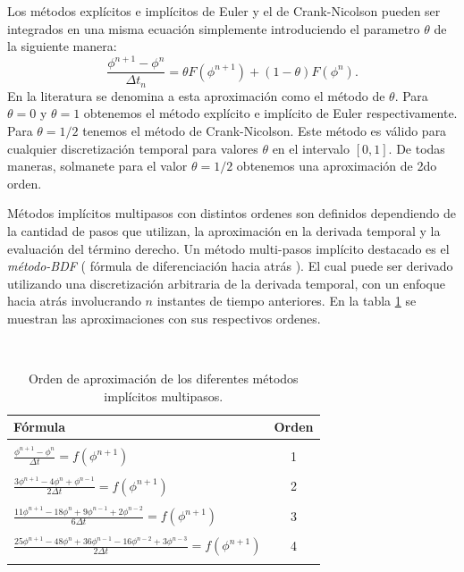 \documentclass[a4paper,10pt, oneside]{book}
\begin{document}
Los métodos explícitos e implícitos de Euler y el de Crank-Nicolson pueden ser integrados en una misma ecuación simplemente introduciendo el parametro $\theta$ de la siguiente manera:
\begin{equation}
	\frac{\phi^{n+1} - \phi^n}{\Delta t_n} = \theta F(\phi^{n+1}) + (1-\theta) F(\phi^n). \nonumber
\end{equation}
En la literatura se denomina a esta aproximación como el método de $\theta$. Para $\theta = 0$ y $\theta = 1$ obtenemos el método explícito e implícito de Euler respectivamente. Para $\theta = 1/2$ tenemos el método de Crank-Nicolson. Este método es válido para cualquier discretización temporal para valores $\theta$ en el intervalo $[0,1]$. De todas maneras, solmanete para el valor $\theta = 1/2$ obtenemos una aproximación de 2do orden.

Métodos implícitos multipasos con distintos ordenes son definidos dependiendo de la cantidad de pasos que utilizan, la aproximación en la derivada temporal y la evaluación del término derecho. Un método multi-pasos implícito destacado es el \textit{método-BDF} ( fórmula de diferenciación hacia atrás ). El cual puede ser derivado utilizando una discretización arbitraria de la derivada temporal, con un enfoque hacia atrás involucrando $n$ instantes de tiempo anteriores. En la tabla \ref{table52} se muestran las aproximaciones con sus respectivos ordenes.

$~$

\begin{table}[h!]
\centering
\begin{tabular}{| l c |}
\hline
Fórmula & Orden \\
\hline
 & \\
$\frac{\phi^{n+1} - \phi^n}{\Delta t} = f(\phi^{n+1}) $ & 1 \\
 & \\
$\frac{3 \phi^{n+1} - 4 \phi^n + \phi^{n-1}}{2 \Delta t} = f(\phi^{n+1}) $ & 2 \\
 & \\
$\frac{11 \phi^{n+1} - 18 \phi^n + 9 \phi^{n-1} + 2 \phi^{n-2}}{6 \Delta t} = f(\phi^{n+1}) $ & 3 \\
 & \\
$\frac{25 \phi^{n+1} - 48 \phi^n + 36 \phi^{n-1} - 16 \phi^{n-2} + 3 \phi^{n-3}}{2 \Delta t} = f(\phi^{n+1}) $ & 4 \\
 & \\
\hline
\end{tabular}
\caption{Orden de aproximación de los diferentes métodos implícitos multipasos.}
\label{table52}
\end{table}
\end{document}

